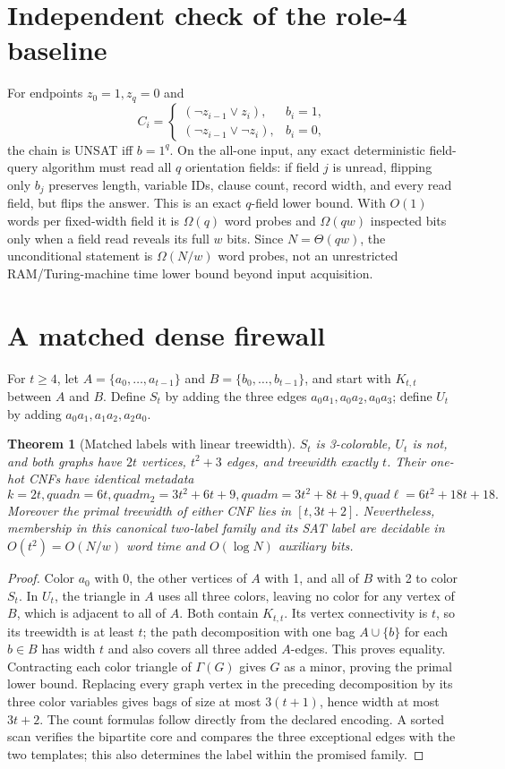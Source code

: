 \documentclass[11pt]{article}
\newtheorem{theorem}{Theorem}
\begin{document}
\section{Independent check of the role-4 baseline}
For endpoints $z_0=1,z_q=0$ and
\[
 C_i=\begin{cases}(\neg z_{i-1}\lor z_i),&b_i=1,\\
 (\neg z_{i-1}\lor\neg z_i),&b_i=0,
 \end{cases}
\]
the chain is UNSAT iff $b=1^q$.  On the all-one input, any exact deterministic
field-query algorithm must read all $q$ orientation fields: if field $j$ is
unread, flipping only $b_j$ preserves length, variable IDs, clause count,
record width, and every read field, but flips the answer.  This is an exact
$q$-field lower bound.  With $O(1)$ words per fixed-width field it is
$\Omega(q)$ word probes and $\Omega(qw)$ inspected bits only when a field read
reveals its full $w$ bits.  Since $N=\Theta(qw)$, the unconditional statement
is $\Omega(N/w)$ word probes, not an unrestricted RAM/Turing-machine time
lower bound beyond input acquisition.

\section{A matched dense firewall}
For $t\ge4$, let $A=\{a_0,\dots,a_{t-1}\}$ and
$B=\{b_0,\dots,b_{t-1}\}$, and start with $K_{t,t}$ between $A$ and $B$.
Define $S_t$ by adding the three edges
$a_0a_1,a_0a_2,a_0a_3$; define $U_t$ by adding
$a_0a_1,a_1a_2,a_2a_0$.

\begin{theorem}[Matched labels with linear treewidth]
$S_t$ is 3-colorable, $U_t$ is not, and both graphs have
$2t$ vertices, $t^2+3$ edges, and treewidth exactly $t$.
Their one-hot CNFs have identical metadata
\[
 k=2t,quad n=6t,quad m_2=3t^2+6t+9,quad
 m=3t^2+8t+9,quad \ell=6t^2+18t+18.
\]
Moreover the primal treewidth of either CNF lies in $[t,3t+2]$.
Nevertheless, membership in this canonical two-label family and its SAT label
are decidable in $O(t^2)=O(N/w)$ word time and $O(\log N)$ auxiliary bits.
\end{theorem}
\begin{proof}
Color $a_0$ with 0, the other vertices of $A$ with 1, and all of $B$ with 2
to color $S_t$.  In $U_t$, the triangle in $A$ uses all three colors, leaving
no color for any vertex of $B$, which is adjacent to all of $A$.
Both contain $K_{t,t}$.  Its vertex connectivity is $t$, so its treewidth is at
least $t$; the path decomposition with one bag $A\cup\{b\}$ for each $b\in B$
has width $t$ and also covers all three added $A$-edges.  This proves equality.
Contracting each color triangle of $\Gamma(G)$ gives $G$ as a minor, proving
the primal lower bound.  Replacing every graph vertex in the preceding
decomposition by its three color variables gives bags of size at most
$3(t+1)$, hence width at most $3t+2$.  The count formulas follow directly from
the declared encoding.  A sorted scan verifies the bipartite core and compares
the three exceptional edges with the two templates; this also determines the
label within the promised family.
\end{proof}
\end{document}
